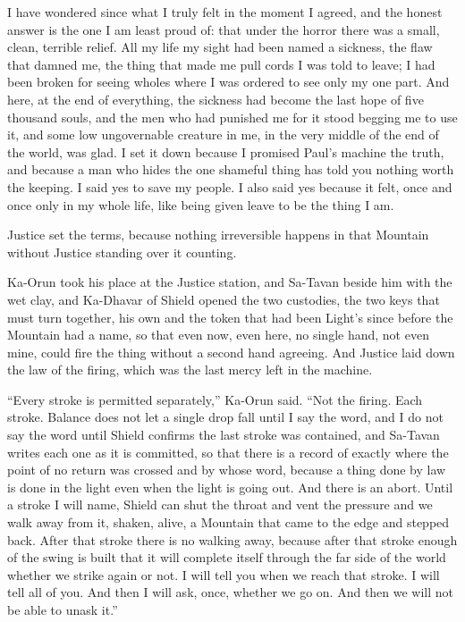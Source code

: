 I have wondered since what I truly felt in the moment I agreed, and the honest answer is the one I am least proud of: that under the horror there was a small, clean, terrible relief. All my life my sight had been named a sickness, the flaw that damned me, the thing that made me pull cords I was told to leave; I had been broken for seeing wholes where I was ordered to see only my one part. And here, at the end of everything, the sickness had become the last hope of five thousand souls, and the men who had punished me for it stood begging me to use it, and some low ungovernable creature in me, in the very middle of the end of the world, was glad. I set it down because I promised Paul's machine the truth, and because a man who hides the one shameful thing has told you nothing worth the keeping. I said yes to save my people. I also said yes because it felt, once and once only in my whole life, like being given leave to be the thing I am.\par

\ornament

Justice set the terms, because nothing irreversible happens in that Mountain without Justice standing over it counting.\par

Ka-Orun took his place at the Justice station, and Sa-Tavan beside him with the wet clay, and Ka-Dhavar of Shield opened the two custodies, the two keys that must turn together, his own and the token that had been Light's since before the Mountain had a name, so that even now, even here, no single hand, not even mine, could fire the thing without a second hand agreeing. And Justice laid down the law of the firing, which was the last mercy left in the machine.\par

``Every stroke is permitted separately,'' Ka-Orun said. ``Not the firing. Each stroke. Balance does not let a single drop fall until I say the word, and I do not say the word until Shield confirms the last stroke was contained, and Sa-Tavan writes each one as it is committed, so that there is a record of exactly where the point of no return was crossed and by whose word, because a thing done by law is done in the light even when the light is going out. And there is an abort. Until a stroke I will name, Shield can shut the throat and vent the pressure and we walk away from it, shaken, alive, a Mountain that came to the edge and stepped back. After that stroke there is no walking away, because after that stroke enough of the swing is built that it will complete itself through the far side of the world whether we strike again or not. I will tell you when we reach that stroke. I will tell all of you. And then I will ask, once, whether we go on. And then we will not be able to unask it.''\par

